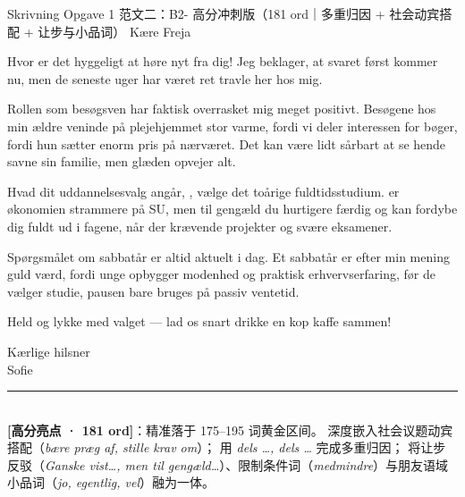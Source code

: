\begin{emailbox}{Skrivning Opgave 1 范文二：B2- 高分冲刺版（181 ord｜多重归因 + 社会动宾搭配 + 让步与小品词）}
Kære Freja

\vspace{0.25em}
Hvor er det hyggeligt at høre nyt fra dig! Jeg beklager, at svaret først kommer nu, men de seneste uger har  været ret travle her hos mig.

\vspace{0.25em}
Rollen som besøgsven har faktisk overrasket mig meget positivt. Besøgene hos min ældre veninde på plejehjemmet  stor varme,  fordi vi deler interessen for bøger,  fordi hun sætter enorm pris på nærværet. Det kan  være lidt sårbart at se hende savne sin familie, men glæden opvejer alt.

\vspace{0.25em}
Hvad dit uddannelsesvalg angår, , vælge det toårige fuldtidsstudium.  er økonomien strammere på SU, men til gengæld  du hurtigere færdig og kan fordybe dig fuldt ud i fagene, når der  krævende projekter og svære eksamener.

\vspace{0.25em}
Spørgsmålet om sabbatår er  altid aktuelt i dag. Et sabbatår er efter min mening guld værd, fordi unge opbygger modenhed og praktisk erhvervserfaring, før de vælger studie,  pausen bare bruges på passiv ventetid.

\vspace{0.25em}
Held og lykke med valget --- lad os snart drikke en kop kaffe sammen!

\vspace{0.25em}
Kærlige hilsner\\
Sofie

\vspace{0.3em}
\rule{\linewidth}{0.4pt}\\[0.2em]
\small\textbf{\color{NCDNavy}[高分亮点 · 181 ord]}：精准落于 175--195 词黄金区间。 深度嵌入社会议题动宾搭配（\textit{bære præg af, stille krav om}）； 用 \textit{dels \ldots, dels \ldots} 完成多重归因； 将让步反驳（\textit{Ganske vist\ldots, men til gengæld\ldots}）、限制条件词（\textit{medmindre}）与朋友语域小品词（\textit{jo, egentlig, vel}）融为一体。
\end{emailbox}

